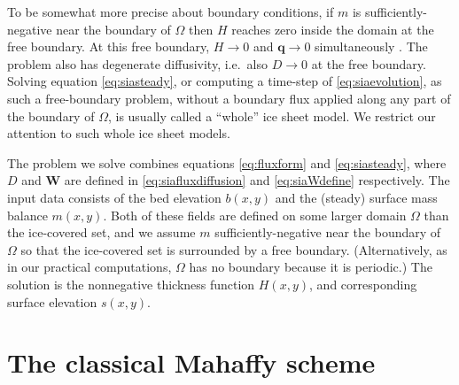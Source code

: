 \documentclass[twocolumn,letterpaper]{igs}
\newcommand\bq{\mathbf{q}}
\newcommand\bW{\mathbf{W}}
\begin{document}
To be somewhat more precise about boundary conditions, if $m$ is sufficiently-negative near the boundary of $\Omega$ then $H$ reaches zero inside the domain at the free boundary.  At this free boundary, $H\to 0$ and $\bq \to 0$ simultaneously \citep{JouvetBueler2012}.  The problem also has degenerate diffusivity, i.e.~also $D \to 0$ at the free boundary.  Solving equation \eqref{eq:siasteady}, or computing a time-step of \eqref{eq:siaevolution}, as such a free-boundary problem, without a boundary flux applied along any part of the boundary of $\Omega$, is usually called a ``whole'' ice sheet model.  We restrict our attention to such whole ice sheet models.

The problem we solve combines equations \eqref{eq:fluxform} and \eqref{eq:siasteady}, where $D$ and $\bW$ are defined in \eqref{eq:siafluxdiffusion} and \eqref{eq:siaWdefine} respectively.  The input data consists of the bed elevation $b(x,y)$ and the (steady) surface mass balance $m(x,y)$.  Both of these fields are defined on some larger domain $\Omega$ than the ice-covered set, and we assume $m$ sufficiently-negative near the boundary of $\Omega$ so that the ice-covered set is surrounded by a free boundary.  (Alternatively, as in our practical computations, $\Omega$ has no boundary because it is periodic.)  The solution is the nonnegative thickness function $H(x,y)$, and corresponding surface elevation $s(x,y)$.


\section{The classical Mahaffy scheme}   \label{sec:mahaffyfd}
\end{document}

